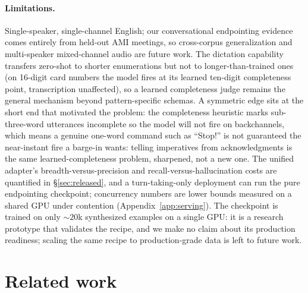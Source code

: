 \documentclass[11pt]{article}
\begin{document}
\paragraph{Limitations.} Single-speaker, single-channel English; our conversational endpointing evidence comes entirely from held-out AMI meetings, so cross-corpus generalization and multi-speaker mixed-channel audio are future work. The dictation capability transfers zero-shot to shorter enumerations but not to longer-than-trained ones (on 16-digit card numbers the model fires at its learned ten-digit completeness point, transcription unaffected), so a learned completeness judge remains the general mechanism beyond pattern-specific schemas. A symmetric edge sits at the short end that motivated the problem: the completeness heuristic marks sub-three-word utterances incomplete so the model will not fire on backchannels, which means a genuine one-word command such as ``Stop!'' is not guaranteed the near-instant fire a barge-in wants: telling imperatives from acknowledgments is the same learned-completeness problem, sharpened, not a new one. The unified adapter's breadth-versus-precision and recall-versus-hallucination costs are quantified in \S\ref{sec:released}, and a turn-taking-only deployment can run the pure endpointing checkpoint; concurrency numbers are lower bounds measured on a shared GPU under contention (Appendix~\ref{app:serving}). The checkpoint is trained on only ${\sim}20$k synthesized examples on a single GPU: it is a research prototype that validates the recipe, and we make no claim about its production readiness; scaling the same recipe to production-grade data is left to future work.

\section{Related work}
\label{sec:related}
\end{document}
